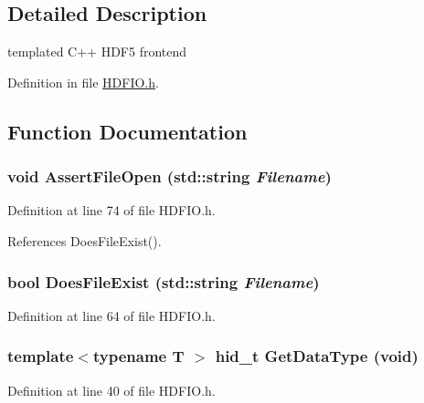 \subsection{Detailed Description}
templated C++ HDF5 frontend 

Definition in file \hyperlink{HDFIO_8h_source}{HDFIO.h}.



\subsection{Function Documentation}
\subsubsection[{AssertFileOpen}]{\setlength{\rightskip}{0pt plus 5cm}void AssertFileOpen (std::string {\em Filename})}\label{HDFIO_8h_a11e198795c8dc7e0753daa6b57083645}


Definition at line 74 of file HDFIO.h.



References DoesFileExist().

\subsubsection[{DoesFileExist}]{\setlength{\rightskip}{0pt plus 5cm}bool DoesFileExist (std::string {\em Filename})}\label{HDFIO_8h_a5c60b85cf0c953cb2868ba5e01e66771}


Definition at line 64 of file HDFIO.h.

\subsubsection[{GetDataType}]{\setlength{\rightskip}{0pt plus 5cm}template$<$typename T $>$ hid\_\-t GetDataType (void)}\label{HDFIO_8h_ae29c5c82995b302af2502eb19bb78490}


Definition at line 40 of file HDFIO.h.


